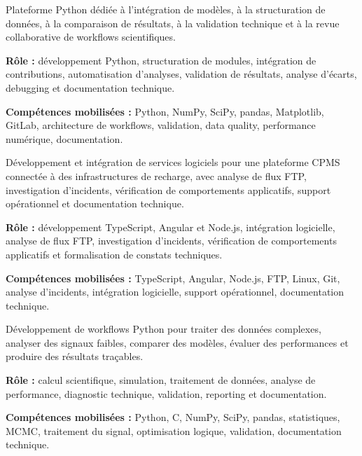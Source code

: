 \documentclass[8pt,a4paper,ragged2e,withhyper]{altacv}
\begin{document}
Plateforme Python dédiée à l’intégration de modèles, à la structuration de données, à la comparaison de résultats, à la validation technique et à la revue collaborative de workflows scientifiques.

\textbf{Rôle :} développement Python, structuration de modules, intégration de contributions, automatisation d’analyses, validation de résultats, analyse d’écarts, debugging et documentation technique.

\textbf{Compétences mobilisées :} Python, NumPy, SciPy, pandas, Matplotlib, GitLab, architecture de workflows, validation, data quality, performance numérique, documentation.

\divider


Développement et intégration de services logiciels pour une plateforme CPMS connectée à des infrastructures de recharge, avec analyse de flux FTP, investigation d’incidents, vérification de comportements applicatifs, support opérationnel et documentation technique.

\textbf{Rôle :} développement TypeScript, Angular et Node.js, intégration logicielle, analyse de flux FTP, investigation d’incidents, vérification de comportements applicatifs et formalisation de constats techniques.

\textbf{Compétences mobilisées :} TypeScript, Angular, Node.js, FTP, Linux, Git, analyse d’incidents, intégration logicielle, support opérationnel, documentation technique.

\divider


Développement de workflows Python pour traiter des données complexes, analyser des signaux faibles, comparer des modèles, évaluer des performances et produire des résultats traçables.

\textbf{Rôle :} calcul scientifique, simulation, traitement de données, analyse de performance, diagnostic technique, validation, reporting et documentation.

\textbf{Compétences mobilisées :} Python, C, NumPy, SciPy, pandas, statistiques, MCMC, traitement du signal, optimisation logique, validation, documentation technique.

\end{document}
